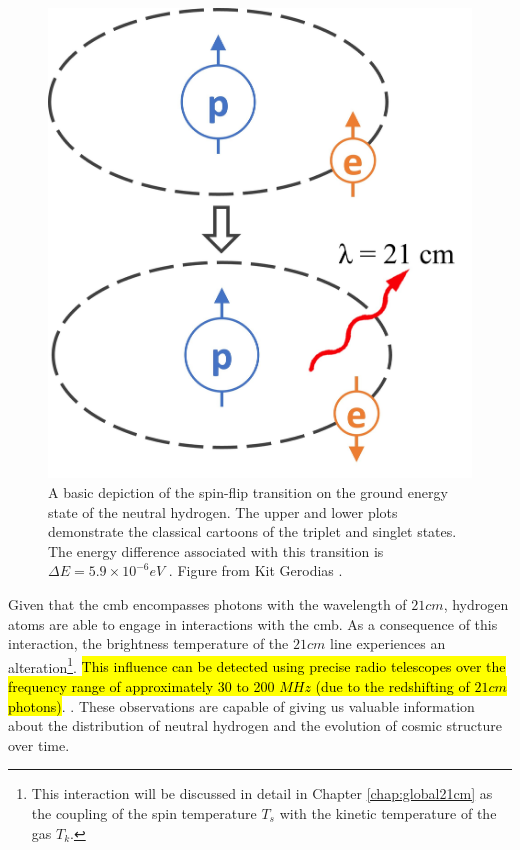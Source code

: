 \documentclass[12pt, TexShade, letterpaper]{report}
\begin{document}
\begin{figure}[h!]
\centering
\includegraphics[scale =0.4]{spinflip.jpg}
\caption[Spin-flip Transition of Neutral Hydrogen]{A basic depiction of the spin-flip transition on the ground energy state of the neutral hydrogen. The upper and lower plots demonstrate the classical cartoons of the triplet and singlet states. The energy difference associated with this transition is $\Delta E = 5.9 \times 10 ^{-6}eV$ \cite{21century}. Figure from Kit Gerodias \cite{kit_thesis}.}
\label{fig:spinflip}
\end{figure}

Given that the \gls{cmb} encompasses photons with the wavelength of $21cm$, hydrogen atoms are able to engage in interactions with the \gls{cmb}. As a consequence of this interaction, the brightness temperature of the $21cm$ line experiences an alteration\footnote{This interaction will be discussed in detail in Chapter \ref{chap:global21cm} as the coupling of the spin temperature $T_s$ with the kinetic temperature of the gas $T_k$.}. \hl{This influence can be detected using precise radio telescopes over the frequency range of approximately 30 to 200 $MHz$ (due to the redshifting of $21cm$ photons)}. \cite{low_frequency}. These observations are capable of giving us valuable information about the distribution of neutral hydrogen and the evolution of cosmic structure over time\cite{low_frequency}.\par
\end{document}
